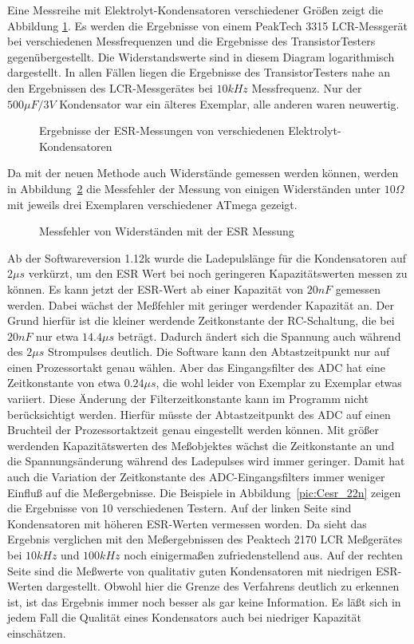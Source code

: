 Eine Messreihe mit Elektrolyt-Kondensatoren verschiedener Größen zeigt die Abbildung \ref{fig:ElcoESR}.
Es werden die Ergebnisse von einem PeakTech 3315 LCR-Messgerät bei verschiedenen Messfrequenzen und die
Ergebnisse des TransistorTesters gegenübergestellt. Die Widerstandswerte sind in diesem Diagram logarithmisch dargestellt.
In allen Fällen liegen die Ergebnisse des TransistorTesters
nahe an den Ergebnissen des LCR-Messgerätes bei \(10kHz\) Messfrequenz. 
Nur der \(500\mu F/3V\) Kondensator war ein älteres Exemplar, alle anderen waren neuwertig.

\begin{figure}[H]
\centering

\caption{Ergebnisse der ESR-Messungen von verschiedenen Elektrolyt-Kondensatoren}
\label{fig:ElcoESR}
\end{figure}

Da mit der neuen Methode auch Widerstände gemessen werden können, werden in Abbildung~\ref{fig:res_esr} die
Messfehler der Messung von einigen Widerständen unter \(10\Omega\) mit jeweils drei Exemplaren verschiedener
ATmega gezeigt.  

\begin{figure}[H]
\centering

\caption{Messfehler von Widerständen mit der ESR Messung}
\label{fig:res_esr}
\end{figure}

Ab der Softwareversion 1.12k wurde die Ladepulslänge für die Kondensatoren auf \(2\mu s\) verkürzt, um den ESR Wert bei noch 
geringeren Kapazitätswerten messen zu können. Es kann jetzt der ESR-Wert ab einer Kapazität von \(20nF\) gemessen werden.
Dabei wächst der Meßfehler mit geringer werdender Kapazität an. Der Grund hierfür ist die kleiner werdende Zeitkonstante
der RC-Schaltung, die bei \(20nF\) nur etwa \(14.4\mu s\) beträgt. Dadurch ändert sich die Spannung auch während des
\(2\mu s\) Strompulses deutlich.
Die Software kann den Abtastzeitpunkt nur auf einen Prozessortakt genau wählen. Aber das Eingangsfilter
des ADC hat eine Zeitkonstante von etwa \(0.24\mu s\), die wohl leider von Exemplar zu Exemplar etwas variiert.
Diese Änderung der Filterzeitkonstante kann im Programm nicht berücksichtigt werden.
Hierfür müsste der Abtastzeitpunkt des ADC auf einen Bruchteil der Prozessortaktzeit genau eingestellt werden können.
Mit größer werdenden Kapazitätswerten
des Meßobjektes wächst die Zeitkonstante an und die Spannungsänderung während des Ladepulses wird immer geringer.
Damit hat auch die Variation der Zeitkonstante des ADC-Eingangsfilters immer weniger Einfluß auf die Meßergebnisse.
Die Beispiele in Abbildung~\ref{pic:Cesr_22n} zeigen die Ergebnisse von 10 verschiedenen Testern. Auf der linken Seite
sind Kondensatoren mit höheren ESR-Werten vermessen worden. Da sieht das Ergebnis verglichen mit den
Meßergebnissen des Peaktech 2170 LCR Meßgerätes bei \(10kHz\) und \(100kHz\) noch einigermaßen zufriedenstellend aus.
Auf der rechten Seite sind die Meßwerte von qualitativ guten Kondensatoren mit niedrigen ESR-Werten dargestellt.
Obwohl hier die Grenze des Verfahrens deutlich zu erkennen ist, ist das Ergebnis immer noch besser als gar keine Information.
Es läßt sich in jedem Fall die Qualität eines Kondensators auch bei niedriger Kapazität einschätzen.

